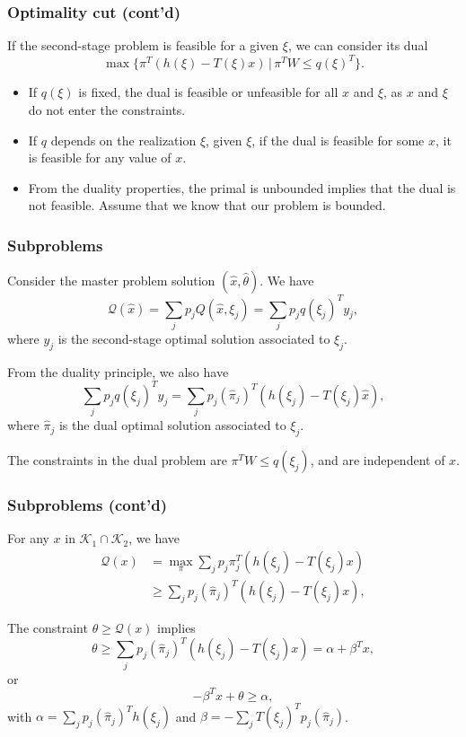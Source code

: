 \documentclass{beamer}
\def\cK{\mathcal{K}}
\begin{document}
\begin{frame}
	\frametitle{Optimality cut (cont'd)}
	
	If {\red the second-stage problem is feasible} for a given $\xi$, we can consider its dual
	\[
	\max \lbrace \pi^T(h(\xi)-T(\xi)x) \,|\, \pi^TW \leq q(\xi)^T \rbrace.
	\]
	
	\begin{itemize}
		\item 
		If $q(\xi)$ is fixed, the dual is feasible or unfeasible for all $x$ and $\xi$, as $x$ and $\xi$ do not enter the constraints.
		\item
		If $q$ depends on the realization $\xi$, given $\xi$, if the dual is feasible for some $x$, it is feasible for any value of $x$.
		\item
		From the duality properties, the primal is unbounded implies that the dual is not feasible.
		Assume that we know that our problem is bounded.
	\end{itemize}
	
	
\end{frame}

\begin{frame}
\frametitle{Subproblems}
	
Consider the master problem solution $(\hat{x}, \hat{\theta})$. We have
\[
\mathcal{Q}(\hat{x}) = \sum_j p_j Q(\hat{x}, \xi_j) = \sum_j p_jq(\xi_j)^Ty_j,
\]
where $y_j$ is the second-stage optimal solution associated to $\xi_j$.
	
\mbox{}

From the duality principle, we also have	
\[
\sum_j p_j q(\xi_j)^T y_j = \sum_j p_j (\hat{\pi}_j)^T(h(\xi_j) -
T(\xi_j)\hat{x}),
\]
where $\hat{\pi}_j$ is the dual optimal solution associated to $\xi_j$.
	
\mbox{}
	
The constraints in the dual problem are $\pi^T W \leq q(\xi_j)$, and are independent of $x$.
	
\end{frame}

\begin{frame}
\frametitle{Subproblems (cont'd)}
	
For any $x$ in $\cK_1 \cap \cK_2$, we have
\begin{align*}
\mathcal{Q}(x) &= \max_{\pi} \sum_j p_j \pi_j^T(h(\xi_j) - T(\xi_j)x) \\
& \geq \sum_j p_j(\hat{\pi}_j)^T(h(\xi_j) - T(\xi_j)x),
\end{align*}
	
\mbox{}
	
The constraint $\theta \geq \mathcal{Q}(x)$ implies
\[
\theta \geq \sum_j p_j(\hat{\pi}_j)^T(h(\xi_j) - T(\xi_j)x) = \alpha +
\beta^Tx,
\]
or
\[
-\beta^Tx + \theta \geq \alpha,
\]
with $\alpha = \sum_j p_j(\hat{\pi}_j)^Th(\xi_j)$ and
$\beta = -\sum_j T(\xi_j)^Tp_j(\hat{\pi}_j)$.
	
\end{frame}
\end{document}
